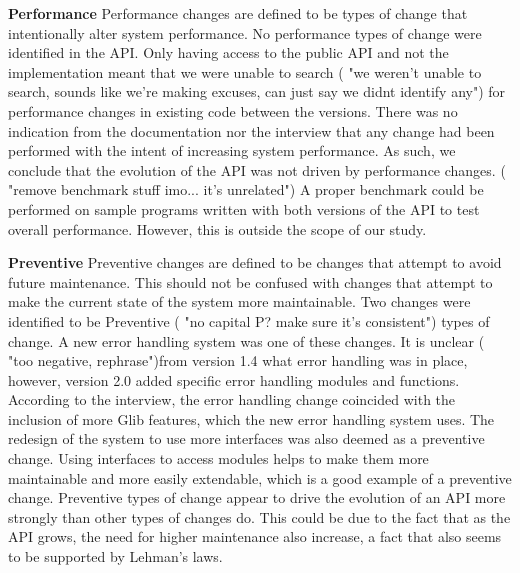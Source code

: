 \documentclass{sig-alternate}
\begin{document}
\smallskip \noindent
\textbf{Performance  }
Performance changes are defined to be types of change that intentionally alter system performance.
No performance types of change were identified in the API. Only having access to the public API and not the implementation meant that we were unable to search ( "we weren't unable to search, sounds like we're making excuses, can just say we didnt identify any") for performance changes in existing code between the versions. There was no indication from the documentation nor the interview that any change had been performed with the intent of increasing system performance. 
As such, we conclude that the evolution of the API was not driven by performance changes. ( "remove benchmark stuff imo... it's unrelated") A proper benchmark could be performed on sample programs written with both versions of the API to test overall performance. However, this is outside the scope of our study.

\smallskip \noindent
\textbf{Preventive  }
Preventive changes are defined to be changes that attempt to avoid future maintenance. This should not be confused with changes that attempt to make the current state of the system more maintainable.
Two changes were identified to be Preventive ( "no capital P? make sure it's consistent") types of change. A new error handling system was one of these changes. It is unclear ( "too negative, rephrase")from version 1.4 what error handling was in place, however, version 2.0 added specific error handling modules and functions. According to the interview, the error handling change coincided with the inclusion of more Glib features, which the new error handling system uses. The redesign of the system to use more interfaces was also deemed as a preventive change. Using interfaces to access modules helps to make them more maintainable and more easily extendable, which is a good example of a preventive change.
Preventive types of change appear to drive the evolution of an API more strongly than other types of changes do. This could be due to the fact that as the API grows, the need for higher maintenance also increase, a fact that also seems to be supported by Lehman's laws.
\end{document}
